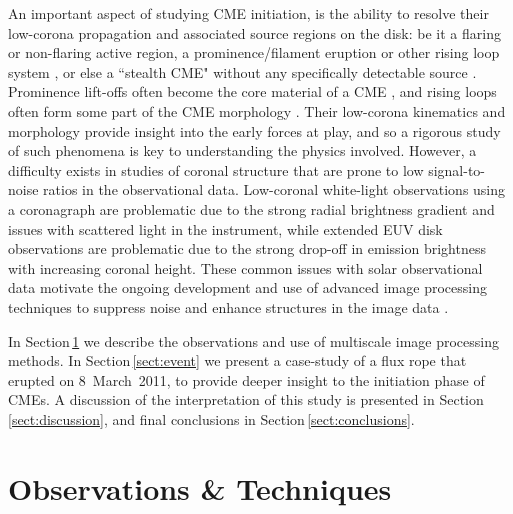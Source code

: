 \documentclass[namedreferences]{solarphysics}
\begin{document}
\begin{article}
An important aspect of studying CME initiation, is the ability to resolve their low-corona propagation and associated source regions on the disk: be it a flaring or non-flaring active region, a prominence/filament eruption or other rising loop system \cite{2002ApJ...566L.117Z,2001ApJ...561..372S}, or else a ``stealth CME" without any specifically detectable source \cite{2013SoPh..285..269H}. Prominence lift-offs often become the core material of a CME \cite{2008AnGeo..26.3025F,2003ApJ...586..562G}, and rising loops often form some part of the CME morphology \cite{2006A&A...455..339D,2004A&A...422..307C}. Their low-corona kinematics and morphology provide insight into the early forces at play, and so a rigorous study of such phenomena is key to understanding the physics involved. However, a difficulty exists in studies of coronal structure that are prone to low signal-to-noise ratios in the observational data. Low-coronal white-light observations using a coronagraph are problematic due to the strong radial brightness gradient and issues with scattered light in the instrument, while extended EUV disk observations are problematic due to the strong drop-off in emission brightness with increasing coronal height. These common issues with solar observational data motivate the ongoing development and use of advanced image processing techniques to suppress noise and enhance structures in the image data \cite{2011ApJ...737...88D,2011AdSpR..47.2118G,2011igi-global,2008ApJ...674.1201S,2008SoPh..248..457Y,2006SoPh..236..263M,2003A&A...398.1185S}. 

In Section\,\ref{sect:techniques} we describe the observations and use of multiscale image processing methods. In Section\,\ref{sect:event} we present a case-study of a flux rope that erupted on 8~March~2011, to provide deeper insight to the initiation phase of CMEs. A discussion of the interpretation of this study is presented in Section\,\ref{sect:discussion}, and final conclusions in Section\,\ref{sect:conclusions}.

\section{Observations \& Techniques}
\label{sect:techniques}



\end{article}
\end{document}
